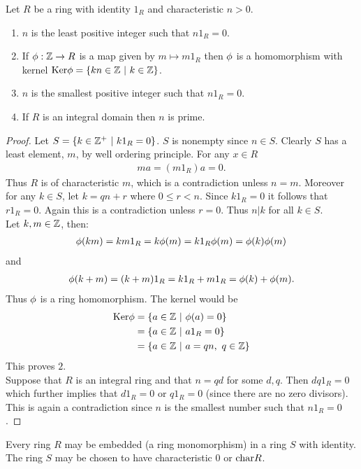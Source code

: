 \begin{theorem}
  Let $R$ be a ring with identity $1_R$ and characteristic $n>0$. 
  \begin{enumerate}
    \item $n$ is the least positive integer such that $n1_R = 0$.
    \item If $\phi:\mathbb{Z} \to R$ is a map given by $m\mapsto m1_R$ then $\phi$ is a homomorphism with kernel $\text{Ker} \phi = \{kn\in \mathbb{Z}\ |\ k\in \mathbb{Z}\}$.
    \item $n$ is the smallest positive integer such that $n1_R = 0$.
    \item If $R$ is an integral domain then $n$ is prime.
  \end{enumerate}
\end{theorem}
\begin{proof}
  Let $S = \{k\in \Z^+\ |\ k1_R = 0\}$. $S$ is nonempty since $n\in S$. Clearly $S$ has a least element, $m$, by well ordering principle. For any $x\in R$
  \begin{align*}
    ma = (m1_R) a = 0.
  \end{align*}
  Thus $R$ is of characteristic $m$, which is a contradiction unless $n=m$. Moreover for any $k\in S$, let $k = qn+r$ where $0\leq r<n$. Since $k1_R = 0$ it follows that $r 1_R = 0$. Again this is a contradiction unless $r = 0$. Thus $n|k$ for all $k\in S$.\\
  Let $k,m\in \mathbb{Z}$, then:
  \begin{align*}
    \phi(km) = km 1_R = k\phi(m) = k1_R \phi(m) = \phi(k)\phi(m)
  \end{align*}
  and
  \begin{align*}
    \phi(k+m) = (k+m)1_R = k1_R + m1_R = \phi(k) + \phi(m). 
  \end{align*}
  Thus $\phi$ is a ring homomorphism. The kernel would be
  \begin{align*}
    \text{Ker} \phi &= \{a\in \mathbb{Z}\ |\ \phi(a) = 0\}\\
           &= \{a\in \mathbb{Z}\ |\ a1_R = 0\} \\
           &= \{a\in \mathbb{Z}\ |\ a = qn,\ q\in \mathbb{Z}\}\\
  \end{align*}
  This proves $2$.\\
  Suppose that $R$ is an integral ring and that $n = qd$ for some $d,q$. Then $dq 1_R = 0$ which further implies that $d1_R = 0$ or $q1_R = 0$ (since there are no zero divisors). This is again a contradiction since $n$ is the smallest number such that $n1_R = 0$.
\end{proof}
\begin{theorem}
  Every ring $R$ may be embedded (a ring monomorphism) in a ring $S$ with identity. The ring $S$ may be chosen to have characteristic $0$ or $\text{char} R$.
\end{theorem}

